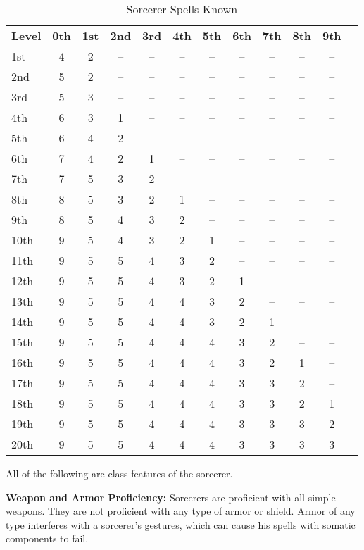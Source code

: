 \begin{table}[htb]
\caption{Sorcerer Spells Known}
\centering
\begin{tabular}{l*{11}{c}}
\textbf{Level} & \textbf{0th} & \textbf{1st} & \textbf{2nd} & \textbf{3rd} & \textbf{4th} & \textbf{5th} & \textbf{6th} & \textbf{7th} & \textbf{8th} & \textbf{9th} \\
1st & 4 & 2 & -- & -- & -- & -- & -- & -- & -- & -- \\
2nd & 5 & 2 & -- & -- & -- & -- & -- & -- & -- & -- \\
3rd & 5 & 3 & -- & -- & -- & -- & -- & -- & -- & -- \\
4th & 6 & 3 & 1 & -- & -- & -- & -- & -- & -- & -- \\
5th & 6 & 4 & 2 & -- & -- & -- & -- & -- & -- & -- \\
6th & 7 & 4 & 2 & 1 & -- & -- & -- & -- & -- & -- \\
7th & 7 & 5 & 3 & 2 & -- & -- & -- & -- & -- & -- \\
8th & 8 & 5 & 3 & 2 & 1 & -- & -- & -- & -- & -- \\
9th & 8 & 5 & 4 & 3 & 2 & -- & -- & -- & -- & -- \\
10th & 9 & 5 & 4 & 3 & 2 & 1 & -- & -- & -- & -- \\
11th & 9 & 5 & 5 & 4 & 3 & 2 & -- & -- & -- & -- \\
12th & 9 & 5 & 5 & 4 & 3 & 2 & 1 & -- & -- & -- \\
13th & 9 & 5 & 5 & 4 & 4 & 3 & 2 & -- & -- & -- \\
14th & 9 & 5 & 5 & 4 & 4 & 3 & 2 & 1 & -- & -- \\
15th & 9 & 5 & 5 & 4 & 4 & 4 & 3 & 2 & -- & -- \\
16th & 9 & 5 & 5 & 4 & 4 & 4 & 3 & 2 & 1 & -- \\
17th & 9 & 5 & 5 & 4 & 4 & 4 & 3 & 3 & 2 & -- \\
18th & 9 & 5 & 5 & 4 & 4 & 4 & 3 & 3 & 2 & 1 \\
19th & 9 & 5 & 5 & 4 & 4 & 4 & 3 & 3 & 3 & 2 \\
20th & 9 & 5 & 5 & 4 & 4 & 4 & 3 & 3 & 3 & 3 \\
\end{tabular}
\end{table}

\ClassFeatures

All of the following are class features of the sorcerer.

\textbf{Weapon and Armor Proficiency:} Sorcerers are proficient with all simple 
weapons. They are not proficient with any type of armor or shield. Armor of any 
type interferes with a sorcerer's gestures, which can cause his spells with somatic 
components to fail.

